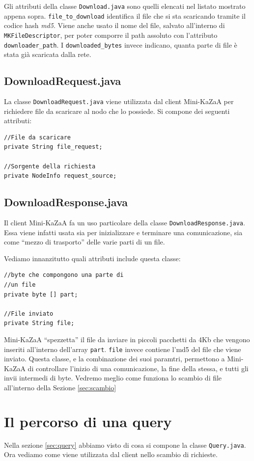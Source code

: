 Gli attributi della classe \verb|Download.java| sono quelli elencati nel listato mostrato appena sopra.
\verb|file_to_download| identifica il file che si sta scaricando tramite il codice hash \emph{md5}. Viene anche usato il nome del file, salvato all'interno di \verb|MKFileDescriptor|, per poter comporre il path assoluto con l'attributo \verb|downloader_path|. I \verb|downloaded_bytes| invece indicano, quanta parte di file è stata già scaricata dalla rete.

\subsection{DownloadRequest.java}
La classe \verb|DownloadRequest.java| viene utilizzata dal client Mini-KaZaA per richiedere file da scaricare al nodo che lo possiede.
Si compone dei seguenti attributi:
\newline
\begin{lstlisting}
//File da scaricare
private String file_request;

//Sorgente della richiesta
private NodeInfo request_source;
\end{lstlisting}

\subsection{DownloadResponse.java}
Il client Mini-KaZaA fa un uso particolare della classe \verb|DownloadResponse.java|. Essa viene infatti usata sia per inizializzare e terminare una comunicazione, sia come ``mezzo di trasporto'' delle varie parti di un file.

Vediamo innanzitutto quali attributi include questa classe:
\newline
\begin{lstlisting}
//byte che compongono una parte di 
//un file
private byte [] part;

//File inviato
private String file;
\end{lstlisting}
Mini-KaZaA ``spezzetta'' il file da inviare in piccoli pacchetti da 4Kb che vengono inseriti all'interno dell'array \verb|part|.
\verb|file| invece contiene l'md5 del file che viene inviato. Questa classe, e la combinazione dei suoi paramtri, permettono a Mini-KaZaA di controllare l'inizio di una comunicazione, la fine della stessa, e tutti gli invii intermedi di byte.
Vedremo meglio come funziona lo scambio di file all'interno della Sezione \ref{sec:scambio}

\section{Il percorso di una query}
Nella sezione \ref{sec:query} abbiamo visto di cosa si compone la classe \verb|Query.java|. Ora vediamo come viene utilizzata dal client nello scambio di richieste.

